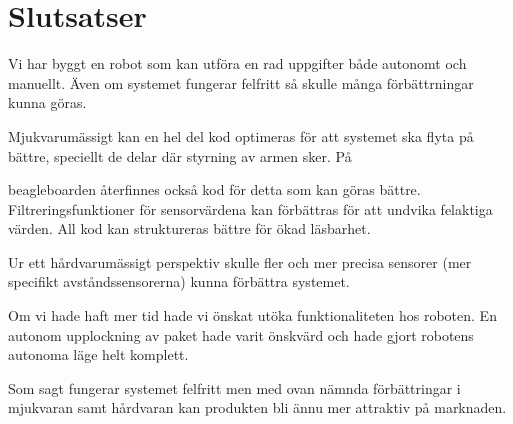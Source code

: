 
\section{Slutsatser}

Vi har byggt en robot som kan utföra en rad uppgifter både autonomt och manuellt. Även om systemet fungerar felfritt så skulle många förbättrningar kunna göras.

Mjukvarumässigt kan en hel del kod optimeras för att systemet ska flyta på bättre, speciellt de delar där styrning av armen sker. På

beagleboarden återfinnes också kod för detta som kan göras bättre. Filtreringsfunktioner för sensorvärdena kan förbättras för att undvika felaktiga värden. All kod kan struktureras bättre för ökad läsbarhet.

Ur ett hårdvarumässigt perspektiv skulle fler och mer precisa sensorer (mer specifikt avståndssensorerna) kunna förbättra systemet.

Om vi hade haft mer tid hade vi önskat utöka funktionaliteten hos roboten. En autonom upplockning av paket hade varit önskvärd och hade gjort robotens autonoma läge helt komplett.

Som sagt fungerar systemet felfritt men med ovan nämnda förbättringar i mjukvaran samt hårdvaran kan produkten bli ännu mer attraktiv på marknaden.
